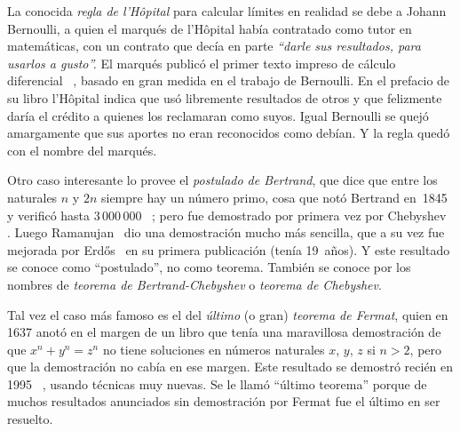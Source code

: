   La conocida \emph{regla de l'Hôpital} para calcular límites%
  en realidad se debe a Johann Bernoulli,%
  a quien el marqués de l'Hôpital%
  había contratado como tutor en matemáticas,
  con un contrato que decía en parte
  \emph{``darle sus resultados,
  para usarlos a gusto''.}
  El marqués publicó el primer texto impreso
  de cálculo diferencial~%
    \cite{lHopital96:_analy_infin_petit_lignes_courb},
  basado en gran medida en el trabajo de Bernoulli.
  En el prefacio de su libro l'Hôpital indica
  que usó libremente resultados de otros
  y que felizmente daría el crédito
  a quienes los reclamaran como suyos.
  Igual Bernoulli se quejó amargamente
  que sus aportes no eran reconocidos como debían.
  Y la regla quedó con el nombre del marqués.

  Otro caso interesante lo provee el \emph{postulado de Bertrand},%
  que dice que entre los naturales \(n\) y \(2 n\)
  siempre hay un número primo,
  cosa que notó Bertrand en~1845
  y verificó hasta \(3\,000\,000\)~%
    \cite{bertrand45:_memoir};
  pero fue demostrado por primera vez por Chebyshev~%
    \cite{chebyshev54:_Bertrand}.%
  Luego Ramanujan~%
    \cite{ramanujan19:_proof_postul}%
  dio una demostración mucho más sencilla,
  que a su vez fue mejorada por Erdős~%
    \cite{erdos30:_beweis_satz_tschebyschef}%
  en su primera publicación
  (tenía 19~años).
  Y este resultado se conoce como ``postulado'',
  no como teorema.
  También se conoce
  por los nombres de \emph{teorema de Bertrand-Chebyshev}%
  o \emph{teorema de Chebyshev}.%

  Tal vez el caso más famoso
  es el del \emph{último} (o gran) \emph{teorema de Fermat},%
  quien en 1637 anotó en el margen de un libro
  que tenía una maravillosa demostración de que \(x^n + y^n = z^n\)
  no tiene soluciones
  en números naturales \(x\), \(y\), \(z\) si \(n > 2\),
  pero que la demostración no cabía en ese margen.
  Este resultado se demostró recién en 1995~%
    \cite{wiles95:_modul_ellip_curves_Fermat},
  usando técnicas muy nuevas.
  Se le llamó ``último teorema''
  porque de muchos resultados anunciados sin demostración por Fermat
  fue el último en ser resuelto.


